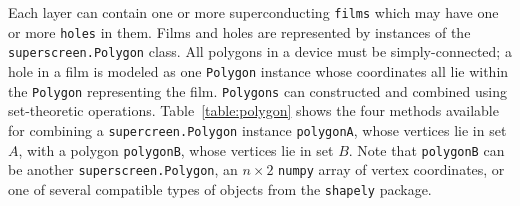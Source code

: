 \documentclass[final,3p,times,twocolumn]{elsarticle}
\newcommand{\inline}[1]{\texttt{#1}\xspace}
\begin{document}
Each layer can contain one or more superconducting \inline{films} which may have one or more \inline{holes} in them. Films and holes are represented by instances of the \inline{superscreen.Polygon} class. All polygons in a device must be simply-connected; a hole in a film is modeled as one \inline{Polygon} instance whose coordinates all lie within the \inline{Polygon} representing the film.
\inline{Polygons} can constructed and combined using set-theoretic operations. Table~\ref{table:polygon} shows the four methods available for combining a \inline{supercreen.Polygon} instance \inline{polygonA}, whose vertices lie in set $A$, with a polygon \inline{polygonB}, whose vertices lie in set $B$. Note that \inline{polygonB} can be another \inline{superscreen.Polygon}, an $n\times 2$ \inline{numpy} array of vertex coordinates, or one of several compatible types of objects from the \inline{shapely} package.
\end{document}
